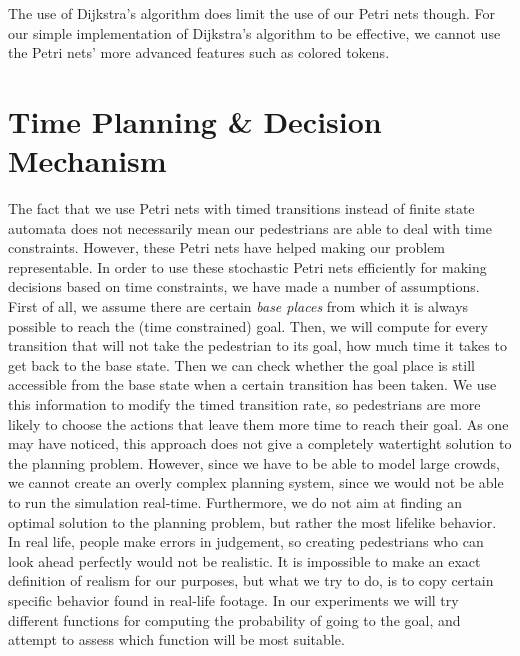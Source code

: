 \documentclass[11pt]{book}
\begin{document}
The use of Dijkstra's algorithm does limit the use of our Petri nets though. For our simple implementation of Dijkstra's algorithm to be effective, we cannot use the Petri nets' more advanced features such as colored tokens.


\section{Time Planning \& Decision Mechanism}
The fact that we use Petri nets with timed transitions instead of finite state automata does not necessarily mean our pedestrians are able to deal with time constraints. However, these Petri nets have helped making our problem representable. In order to use these stochastic Petri nets efficiently for making decisions based on time constraints, we have made a number of assumptions.\\
First of all, we assume there are certain \emph{base places} from which it is always possible to reach the (time constrained) goal. Then, we will compute for every transition that will not take the pedestrian to its goal, how much time it takes to get back to the base state. Then we can check whether the goal place is still accessible from the base state when a certain transition has been taken. We use this information to modify the timed transition rate, so pedestrians are more likely to choose the actions that leave them more time to reach their goal.
As one may have noticed, this approach does not give a completely watertight solution to the planning problem. However, since we have to be able to model large crowds, we cannot create an overly complex planning system, since we would not be able to run the simulation real-time. Furthermore, we do not aim at finding an optimal solution to the planning problem, but rather the most lifelike behavior. In real life, people make errors in judgement, so creating pedestrians who can look ahead perfectly would not be realistic. It is impossible to make an exact definition of realism for our purposes, but what we try to do, is to copy certain specific behavior found in real-life footage. In our experiments we will try different functions for computing the probability of going to the goal, and attempt to assess which function will be most suitable.
\end{document}
